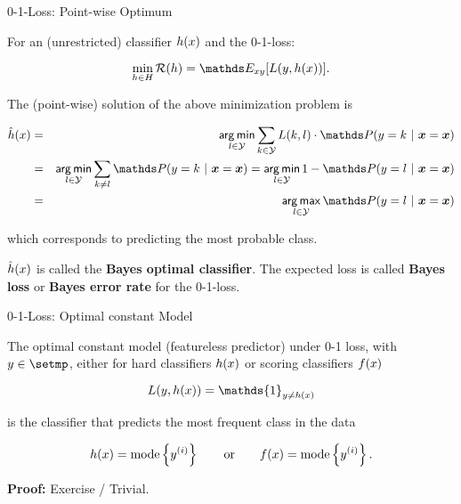 \begin{vbframe}{0-1-Loss: Point-wise Optimum}

For an (unrestricted) classifier $h(x)$ and the 0-1-loss: 

$$
\min_{h \in \Hspace} \risk(h) = \E_{xy}[L(y, \hx)]. 
$$

The (point-wise) solution of the above minimization problem is

\begin{footnotesize}
  \begin{eqnarray*}  
  \hxh &=& \argmin_{l \in \Yspace} \sum_{k \in \Yspace} L(k, l) \cdot \P(y = k~|~\xv = \xv) \\
  &=& \argmin_{l \in \Yspace} \sum_{k \ne l} \P(y = k~|~\xv = \xv) = \argmin_{l \in \Yspace} 1 - \P(y = l~|~\xv = \xv) \\
  &=& \argmax_{l \in \Yspace} \P(y = l~|~ \xv = \xv)
  \end{eqnarray*}
\end{footnotesize}

which corresponds to predicting the most probable class. 

\lz 

$\hat{h}(x)$ is called the \textbf{Bayes optimal classifier}. The expected loss is called \textbf{Bayes loss} or \textbf{Bayes error rate} for the 0-1-loss.


\end{vbframe}

\begin{vbframe}{0-1-Loss: Optimal constant Model}

The optimal constant model (featureless predictor) under 0-1 loss, with $y \in \setmp$, either for hard classifiers $h(x)$ or scoring classifiers $f(x)$ 

$$
  L(y, \hx) = \mathds{1}_{y \neq \hx}
$$

is the classifier that predicts the most frequent class in the data


$$
h(x) = \text{mode} \left\{y^{(i)}\right\} \qquad \text{or} \qquad f(x) = \text{mode} \left\{y^{(i)}\right\}.
$$

\textbf{Proof:} Exercise / Trivial. 



\end{vbframe}

